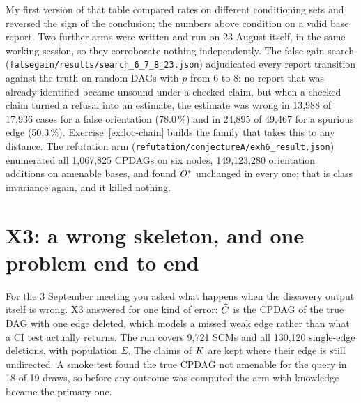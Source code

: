 My first version of that table compared rates on different conditioning sets and reversed the sign
of the conclusion; the numbers above condition on a valid base report. Two further arms were written
and run on 23 August itself, in the same working session, so they corroborate nothing independently.
The false-gain search (\texttt{falsegain/results/search\_6\_7\_8\_23.json}) adjudicated every report
transition against the truth on random DAGs with $p$ from 6 to 8: no report that was already
identified became unsound under a checked claim, but when a checked claim turned a refusal into an
estimate, the estimate was wrong in 13,988 of 17,936 cases for a false orientation (78.0\,\%) and in
24,895 of 49,467 for a spurious edge (50.3\,\%). Exercise~\ref{ex:loc-chain} builds the family that
takes this to any distance. The refutation arm (\texttt{refutation/conjectureA/exh6\_result.json})
enumerated all 1,067,825 CPDAGs on six nodes, 149,123,280 orientation additions on amenable bases, and found $O^{*}$
unchanged in every one; that is class invariance again, and it killed nothing.


\begin{antes}
\end{antes}

\section{X3: a wrong skeleton, and one problem end to end}

For the 3 September meeting you asked what happens when the discovery output itself is wrong. X3 answered for
one kind of error: $\widehat{C}$ is the CPDAG of the true DAG with one edge deleted, which models a missed
weak edge rather than what a CI test actually returns. The run covers 9,721 SCMs and all 130,120
single-edge deletions, with population $\Sigma$. The claims of $K$ are kept where their edge is
still undirected. A smoke test found the true CPDAG not amenable for the query in 18 of 19 draws,
so before any outcome was computed the arm with knowledge became the primary one.

